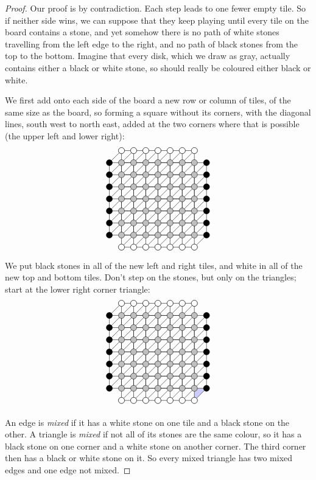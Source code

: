 \begin{proof}
Our proof is by contradiction.
Each step leads to one fewer empty tile.
So if neither side wins, we can suppose that they keep playing until every tile on the board contains a stone, and yet somehow there is no path of white stones travelling from the left edge to the right, and no path of black stones from the top to the bottom.
Imagine that every disk, which we draw as gray, actually contains either a black or white stone, so should really be coloured either black or white.

We first add onto each side of the board a new row or column of tiles, of the same size as the board, so forming a square without its corners, with the diagonal lines, south west to north east, added at the two corners where that is possible (the upper left and lower right):
\[
\begin{tikzpicture}[scale=.5]
\draw (-1,0) grid (7,6);
\draw (0,-1) grid (6,7);
\foreach \i in {-1,...,6}
{
	\foreach \j in {0,...,5}
	{
		\draw (\i,\j) -- ({1+\i},{1+\j});
	}
}
\foreach \i in {0,...,6}
{
\draw ({\i-1},6) -- (\i,7);
\draw (\i,-1) -- ({\i+1},0);
}
\foreach \i in {0,...,6}
{
	\foreach \j in {-1,...,7}
	{
		\draw[black,fill=gray!50] (\i,\j) circle (.25cm);
	}
	\draw[black,fill=white] (\i,-1) circle (.25cm);
	\draw[black,fill=white] (\i,7) circle (.25cm);
	\draw[black,fill=black] (-1,\i) circle (.25cm);
	\draw[black,fill=black] (7,\i) circle (.25cm);
}
\end{tikzpicture}
\]
We put black stones in all of the new left and right tiles, and white in all of the new top and bottom tiles.
Don't step on the stones, but only on the triangles; start at the lower right corner triangle:
\[
\begin{tikzpicture}[scale=.5]
\fill[blue!20] (6,-1) -- (7,0) -- (6,0) -- cycle;
\draw (-1,0) grid (7,6);
\draw (0,-1) grid (6,7);
\foreach \i in {-1,...,6}
{
	\foreach \j in {0,...,5}
	{
		\draw (\i,\j) -- ({1+\i},{1+\j});
	}
}
\foreach \i in {0,...,6}
{
\draw ({\i-1},6) -- (\i,7);
\draw (\i,-1) -- ({\i+1},0);
}
\foreach \i in {0,...,6}
{
	\foreach \j in {-1,...,7}
	{
		\draw[black,fill=gray!50] (\i,\j) circle (.25cm);
	}
	\draw[black,fill=white] (\i,-1) circle (.25cm);
	\draw[black,fill=white] (\i,7) circle (.25cm);
	\draw[black,fill=black] (-1,\i) circle (.25cm);
	\draw[black,fill=black] (7,\i) circle (.25cm);
}
\end{tikzpicture}
\]

An edge is \emph{mixed} if it has a white stone on one tile and a black stone on the other.
A triangle is \emph{mixed} if not all of its stones are the same colour, so it has a black stone on one corner and a white stone on another corner.
The third corner then has a black or white stone on it.
So every mixed triangle has two mixed edges and one edge not mixed.


\end{proof}
